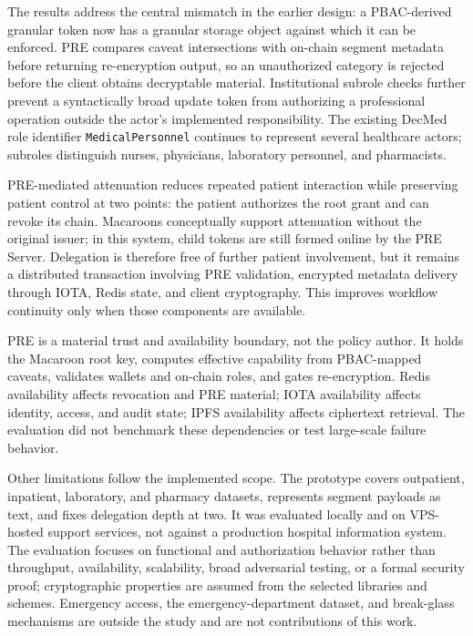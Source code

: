 The results address the central mismatch in the earlier design: a PBAC-derived granular token now has a granular storage object against which it can be enforced. PRE compares caveat intersections with on-chain segment metadata before returning re-encryption output, so an unauthorized category is rejected before the client obtains decryptable material. Institutional subrole checks further prevent a syntactically broad update token from authorizing a professional operation outside the actor's implemented responsibility. The existing DecMed role identifier \texttt{MedicalPersonnel} continues to represent several healthcare actors; subroles distinguish nurses, physicians, laboratory personnel, and pharmacists.

PRE-mediated attenuation reduces repeated patient interaction while preserving patient control at two points: the patient authorizes the root grant and can revoke its chain. Macaroons conceptually support attenuation without the original issuer; in this system, child tokens are still formed online by the PRE Server. Delegation is therefore free of further patient involvement, but it remains a distributed transaction involving PRE validation, encrypted metadata delivery through IOTA, Redis state, and client cryptography. This improves workflow continuity only when those components are available.

PRE is a material trust and availability boundary, not the policy author. It holds the Macaroon root key, computes effective capability from PBAC-mapped caveats, validates wallets and on-chain roles, and gates re-encryption. Redis availability affects revocation and PRE material; IOTA availability affects identity, access, and audit state; IPFS availability affects ciphertext retrieval. The evaluation did not benchmark these dependencies or test large-scale failure behavior.

Other limitations follow the implemented scope. The prototype covers outpatient, inpatient, laboratory, and pharmacy datasets, represents segment payloads as text, and fixes delegation depth at two. It was evaluated locally and on VPS-hosted support services, not against a production hospital information system. The evaluation focuses on functional and authorization behavior rather than throughput, availability, scalability, broad adversarial testing, or a formal security proof; cryptographic properties are assumed from the selected libraries and schemes. Emergency access, the emergency-department dataset, and break-glass mechanisms are outside the study and are not contributions of this work.

